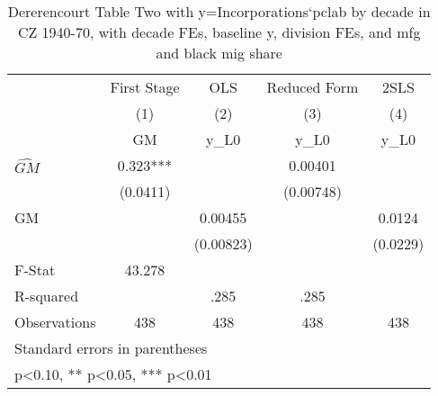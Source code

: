 \begin{table}[htbp]\centering
\def\sym#1{\ifmmode^{#1}\else\(^{#1}\)\fi}
\caption{Dererencourt Table Two with y=Incorporations`pclab by decade in CZ 1940-70, with decade FEs, baseline y, division FEs, and mfg and black mig share}
\begin{tabular}{l*{4}{c}}
\toprule
                    & First Stage   &         OLS   &Reduced Form   &        2SLS   \\
                    &\multicolumn{1}{c}{(1)}&\multicolumn{1}{c}{(2)}&\multicolumn{1}{c}{(3)}&\multicolumn{1}{c}{(4)}\\
                    &\multicolumn{1}{c}{GM}&\multicolumn{1}{c}{y\_L0}&\multicolumn{1}{c}{y\_L0}&\multicolumn{1}{c}{y\_L0}\\
\midrule
$\hat{GM}$          &       0.323***&               &     0.00401   &               \\
                    &    (0.0411)   &               &   (0.00748)   &               \\
\addlinespace
GM                  &               &     0.00455   &               &      0.0124   \\
                    &               &   (0.00823)   &               &    (0.0229)   \\
\midrule
F-Stat              &      43.278   &               &               &               \\
R-squared           &               &        .285   &        .285   &               \\
Observations        &         438   &         438   &         438   &         438   \\
\bottomrule
\multicolumn{5}{l}{\footnotesize Standard errors in parentheses}\\
\multicolumn{5}{l}{\footnotesize * p<0.10, ** p<0.05, *** p<0.01}\\
\end{tabular}
\end{table}
